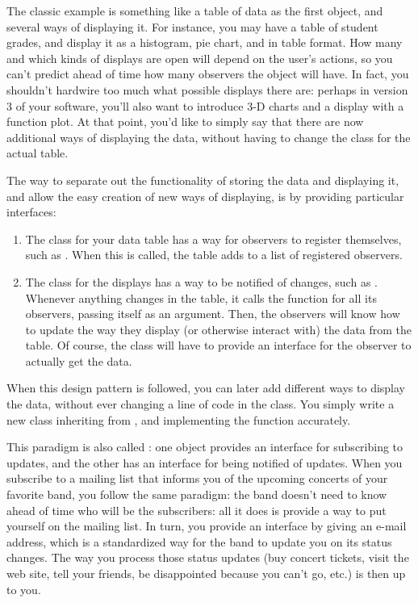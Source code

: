 The classic example is something like a table of data as the first
object, and several ways of displaying it. For instance, you may have
a table of student grades, and display it as a histogram, pie chart,
and in table format. How many and which kinds of displays are open
will depend on the user's actions, so you can't predict ahead of time
how many observers the object will have. In fact, you shouldn't
hardwire too much what possible displays there are: perhaps in version
3 of your software, you'll also want to introduce 3-D charts and a
display with a function plot. At that point, you'd like to simply say
that there are now additional ways of displaying the data, without
having to change the class for the actual table.

The way to separate out the functionality of storing the data and
displaying it, and allow the easy creation of new ways of displaying,
is by providing particular interfaces:

\begin{enumerate}
\item The class for your data table has a way for observers to
  register themselves, such as .
  When this is called, the table adds  to a list of
  registered observers.
\item The class for the displays has a way to be notified of changes,
  such as .
  Whenever anything changes in the table, it calls the 
  function for all its observers, passing itself as an argument.
  Then, the observers will know how to update the way they display (or
  otherwise interact with) the data from the table.
  Of course, the  class will have to provide an interface
  for the observer to actually get the data.
\end{enumerate}

When this design pattern is followed, you can later add different ways
to display the data, without ever changing a line of code in the
 class. You simply write a new class inheriting from
, and implementing the  function
accurately.

This paradigm is also called : one object
provides an interface for subscribing to updates, and the other has an
interface for being notified of updates. When you subscribe to a
mailing list that informs you of the upcoming concerts of your
favorite band, you follow the same paradigm: the band doesn't need
to know ahead of time who will be the subscribers: all it does is provide a
way to put yourself on the mailing list. In turn, you provide an
interface by giving an e-mail address, which is a standardized way for
the band to update you on its status changes. The way you process
those status updates (buy concert tickets, visit the web site, tell
your friends, be disappointed because you can't go, etc.) is then up to you.

